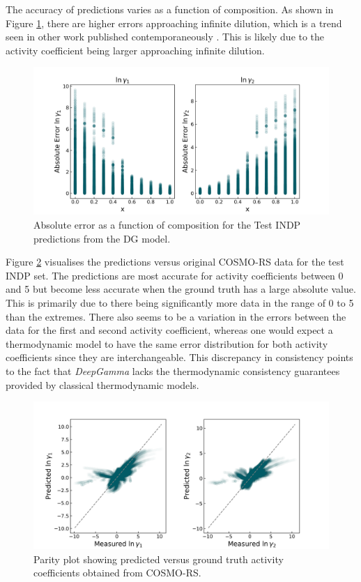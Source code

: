The accuracy of predictions varies as a function of composition. As shown in Figure \ref{fig:absolute_error_composition}, there are higher errors approaching infinite dilution, which is a trend seen in other work published contemporaneously \cite{Winter2022}. This is likely due to the activity coefficient being larger approaching infinite dilution.

\begin{figure}
    \centering
    \includegraphics[width=\textwidth]{gfx/Chapter07/DG_test_indp_absolute_error_vs_composition.png}
    \caption{Absolute error as a function of composition for the Test INDP predictions from the DG model.}
    \label{fig:absolute_error_composition}
\end{figure}

Figure \ref{fig:dg_test_indp_parity_plot} visualises the predictions versus original COSMO-RS data for the test INDP set. The predictions are most accurate for activity coefficients between 0 and 5 but become less accurate when the ground truth has a large absolute value. This is primarily due to there being significantly more data in the range of 0 to 5 than the extremes. There also seems to be a variation in the errors between the data for the first and second activity coefficient, whereas one would expect a thermodynamic model to have the same error distribution for both activity coefficients since they are interchangeable. This discrepancy in consistency points to the fact that \textit{DeepGamma} lacks the thermodynamic consistency guarantees provided by classical thermodynamic models.
 
\begin{figure}
    \centering
    \includegraphics[width=\textwidth]{gfx/Chapter07/DG_test_indp_parity_plot.png}
    \caption{Parity plot showing predicted versus ground truth activity coefficients obtained from COSMO-RS.}
    \label{fig:dg_test_indp_parity_plot}
\end{figure}

